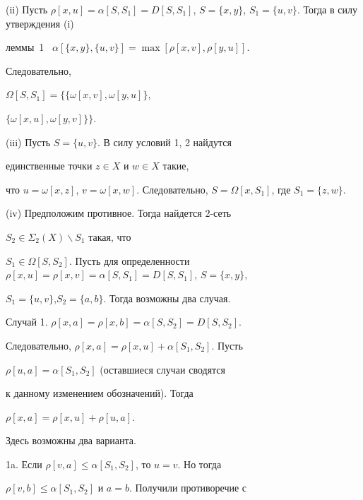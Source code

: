(ii) Пусть $\rho [x,u] = \alpha [S,S_{1}] = D[S,S_{1}]$, $S =


\{x, y\}$, $S_{1} = \{u, v\}$. Тогда в силу утверждения (i)


леммы~1 \ $\alpha [\{x, y\},\{u, v\}] = \max [\rho [x,v],\rho [y,u]]$.


Следовательно, 


$\Omega [S,S_{1}] = \{\{\omega[x,v],\omega[y,u]\}$,




$\{\omega[x,u],\omega[y,v]\}\}$.





(iii) Пусть $S = \{u, v\}$. В силу условий 1, 2 найдутся


единственные точки $z \in X$ и $w \in X$ такие,


что $u = \omega [x,z]$, $v = \omega [x,w]$. Следовательно, $S =


\Omega [x,S_{1}]$, где $S_{1} = \{z, w\}$.





(iv) Предположим противное. Тогда найдется $2$-сеть


$S_{2} \in \Sigma_{2}(X)\backslash S_{1}$ такая, что


$S_{1} \in \Omega [S,S_{2}]$. Пусть для определенности $\rho [x,u]


= \rho [x,v] = \alpha [S,S_{1}] = D[S,S_{1}]$, $S = \{x, y\}$,


$S_{1} = \{u, v\}$,\linebreak $S_{2} = \{a, b\}$. Тогда возможны два случая.





Случай 1. $\rho [x,a] = \rho [x,b] = \alpha [S,S_{2}] = D[S,S_{2}]$.


Следовательно, $\rho [x,a] = \rho [x,u] + \alpha [S_{1},S_{2}]$. Пусть


$\rho [u,a] = \alpha [S_{1},S_{2}]$ (оставшиеся случаи сводятся


к данному изменением обозначений). Тогда


$\rho [x,a] = \rho [x,u] +  \rho [u,a]$.


Здесь возможны два варианта.





1a. Если $\rho [v,a] \leq  \alpha [S_{1},S_{2}]$, то $u = v$. Но тогда


$\rho [v,b] \leq  \alpha [S_{1},S_{2}]$ и $a = b$. Получили противоречие с


